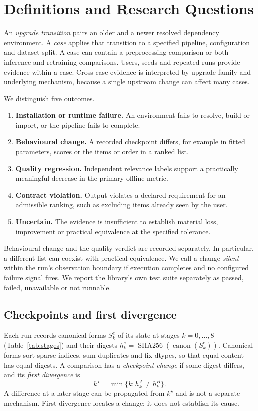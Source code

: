 \documentclass[11pt,a4paper]{article}
\begin{document}
\section{Definitions and Research Questions}
\label{sec:definitions}

An \emph{upgrade transition} pairs an older and a newer resolved dependency
environment. A \emph{case} applies that transition to a specified pipeline,
configuration and dataset split. A case can contain a preprocessing comparison
or both inference and retraining comparisons. Users, seeds and repeated runs
provide evidence within a case. Cross-case evidence is interpreted by upgrade
family and underlying mechanism, because a single upstream change can affect
many cases.

We distinguish five outcomes.
\begin{enumerate}
  \item \textbf{Installation or runtime failure.} An environment fails to
    resolve, build or import, or the pipeline fails to complete.
  \item \textbf{Behavioural change.} A recorded checkpoint differs, for
    example in fitted parameters, scores or the items or order in a ranked list.
  \item \textbf{Quality regression.} Independent relevance labels support a
    practically meaningful decrease in the primary offline metric.
  \item \textbf{Contract violation.} Output violates a declared requirement
    for an admissible ranking, such as excluding items already seen by the user.
  \item \textbf{Uncertain.} The evidence is insufficient to establish material
    loss, improvement or practical equivalence at the specified tolerance.
\end{enumerate}
Behavioural change and the quality verdict are recorded separately. In
particular, a different list can coexist with practical equivalence. We call a
change \emph{silent} within the run's observation boundary if execution
completes and no configured failure signal fires. We report the library's own
test suite separately as passed, failed, unavailable or not runnable.

\subsection{Checkpoints and first divergence}
Each run records canonical forms $S^e_k$ of its state at stages
$k=0,\dots,8$ (Table~\ref{tab:stages}) and their digests
$h^e_k=\operatorname{SHA256}(\operatorname{canon}(S^e_k))$. Canonical forms
sort sparse indices, sum duplicates and fix dtypes, so that equal content has
equal digests. A comparison has a \emph{checkpoint change} if some digest
differs, and its \emph{first divergence} is
\begin{equation}
 k^\star=\min\{k : h^A_k\neq h^B_k\}.
 \label{eq:first-divergence}
\end{equation}
A difference at a later stage can be propagated from $k^\star$ and is not a
separate mechanism. First divergence locates a change; it does not establish
its cause.
\end{document}
